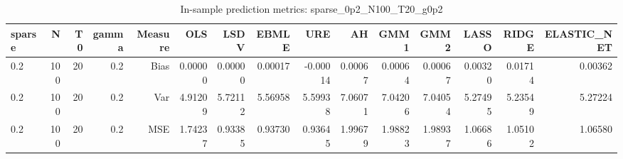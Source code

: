 \begin{table}[!htbp]\centering
\caption{In-sample prediction metrics: sparse_0p2_N100_T20_g0p2}
\label{tab:table2_sparse_0p2_N100_T20_g0p2}
\begin{tabular}{lrrrrrrrrrrrrrr}
\hline
sparse & N & T0 & gamma & Measure & OLS & LSDV & EBMLE & URE & AH & GMM1 & GMM2 & LASSO & RIDGE & ELASTIC_NET \\
\hline
0.2 & 100 & 20 & 0.2 & Bias & 0.00000 & 0.00000 & 0.00017 & -0.00014 & 0.00067 & 0.00064 & 0.00067 & 0.00320 & 0.01714 & 0.00362 \\
0.2 & 100 & 20 & 0.2 & Var & 4.91209 & 5.72112 & 5.56958 & 5.59938 & 7.06071 & 7.04206 & 7.04054 & 5.27495 & 5.23549 & 5.27224 \\
0.2 & 100 & 20 & 0.2 & MSE & 1.74237 & 0.93385 & 0.93730 & 0.93645 & 1.99679 & 1.98823 & 1.98937 & 1.06686 & 1.05102 & 1.06580 \\
\hline
\end{tabular}
\end{table}

